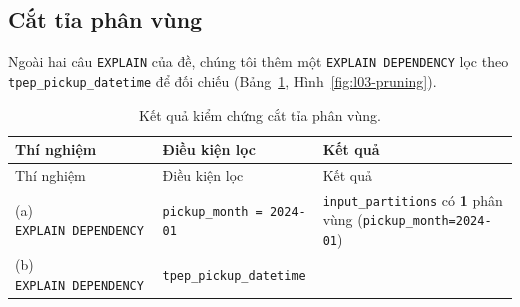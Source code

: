 \documentclass[
  12pt,
  a4paper,
]{article}
\begin{document}
\subsection{Cắt tỉa phân vùng}\label{sec:l03-res-pruning}

Ngoài hai câu \texttt{EXPLAIN} của đề, chúng tôi thêm một
\texttt{EXPLAIN\ DEPENDENCY}\allowbreak{} lọc theo
\texttt{tpep\_}\allowbreak{}\texttt{pickup\_}\allowbreak{}\texttt{datetime}\allowbreak{}
để đối chiếu (Bảng~\ref{tbl:l03-pruning}, Hình~\ref{fig:l03-pruning}).

\begin{longtable}[]{@{}
  >{\raggedright\arraybackslash}p{}
  >{\raggedright\arraybackslash}p{}
  >{\raggedright\arraybackslash}p{}@{}}
\caption{\label{tbl:l03-pruning}Kết quả kiểm chứng cắt tỉa phân
vùng.}\tabularnewline
\toprule\noalign{}
\begin{minipage}[b]{\linewidth}\raggedright
Thí nghiệm
\end{minipage} & \begin{minipage}[b]{\linewidth}\raggedright
Điều kiện lọc
\end{minipage} & \begin{minipage}[b]{\linewidth}\raggedright
Kết quả
\end{minipage} \\
\midrule\noalign{}
\endfirsthead
\toprule\noalign{}
\begin{minipage}[b]{\linewidth}\raggedright
Thí nghiệm
\end{minipage} & \begin{minipage}[b]{\linewidth}\raggedright
Điều kiện lọc
\end{minipage} & \begin{minipage}[b]{\linewidth}\raggedright
Kết quả
\end{minipage} \\
\midrule\noalign{}
\endhead
\bottomrule\noalign{}
\endlastfoot
(a) \texttt{EXPLAIN\ DEPENDENCY}\allowbreak{} &
\texttt{pickup\_}\allowbreak{}\texttt{month\ =}\allowbreak{}\texttt{\ \textquotesingle{}2024-01\textquotesingle{}}\allowbreak{}
& \texttt{input\_}\allowbreak{}\texttt{partitions}\allowbreak{} có
\textbf{1} phân vùng
(\texttt{pickup\_}\allowbreak{}\texttt{month=}\allowbreak{}\texttt{2024-01}\allowbreak{}) \\
(b) \texttt{EXPLAIN\ DEPENDENCY}\allowbreak{} &
\texttt{tpep\_}\allowbreak{}\texttt{pickup\_}\allowbreak{}\texttt{datetime}\allowbreak{}

\end{longtable}
\end{document}
